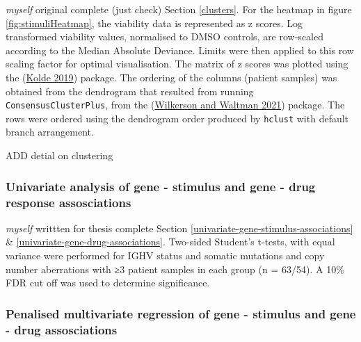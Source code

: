 \documentclass[11pt, a4paper, twosided]{book}
\begin{document}
\emph{myself} original complete (just check)
Section \ref{clusters}. For the heatmap in figure \ref{fig:stimuliHeatmap}, the viability data is represented as z scores. Log transformed viability values, normalised to DMSO controls, are row-scaled according to the Median Absolute Deviance. Limits were then applied to this row scaling factor for optimal visualisation. The matrix of z scores was plotted using the (\protect\hyperlink{ref-R-pheatmap}{Kolde 2019}) package. The ordering of the columns (patient samples) was obtained from the dendrogram that resulted from running \texttt{ConsensusClusterPlus}, from the (\protect\hyperlink{ref-R-ConsensusClusterPlus}{Wilkerson and Waltman 2021}) package. The rows were ordered using the dendrogram order produced by \texttt{hclust} with default branch arrangement.

ADD detial on clustering

\hypertarget{univariate-gene-stimulus-associations-method}{%
\subsubsection{Univariate analysis of gene - stimulus and gene - drug response assosciations}\label{univariate-gene-stimulus-associations-method}}

\emph{myself} writtten for thesis complete
Section \ref{univariate-gene-stimulus-associations} \& \ref{univariate-gene-drug-associations}. Two-sided Student's t-tests, with equal variance were performed for IGHV status and somatic mutations and copy number aberrations with ≥3 patient samples in each group (n = 63/54). A 10\% FDR cut off was used to determine significance.

\hypertarget{multivariate-gene-stimulus-assosciations-method}{%
\subsubsection{Penalised multivariate regression of gene - stimulus and gene - drug assosciations}\label{multivariate-gene-stimulus-assosciations-method}}
\end{document}
